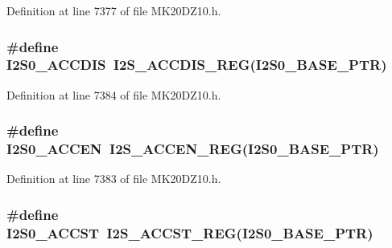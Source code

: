Definition at line 7377 of file M\+K20\+D\+Z10.\+h.

\subsubsection[{\texorpdfstring{I2\+S0\+\_\+\+A\+C\+C\+D\+IS}{I2S0_ACCDIS}}]{\setlength{\rightskip}{0pt plus 5cm}\#define I2\+S0\+\_\+\+A\+C\+C\+D\+IS~{\bf I2\+S\+\_\+\+A\+C\+C\+D\+I\+S\+\_\+\+R\+EG}({\bf I2\+S0\+\_\+\+B\+A\+S\+E\+\_\+\+P\+TR})}\hypertarget{group___i2_s___register___accessor___macros_ga5f11c0b20979a1e2af8ee912693250c7}{}\label{group___i2_s___register___accessor___macros_ga5f11c0b20979a1e2af8ee912693250c7}


Definition at line 7384 of file M\+K20\+D\+Z10.\+h.

\subsubsection[{\texorpdfstring{I2\+S0\+\_\+\+A\+C\+C\+EN}{I2S0_ACCEN}}]{\setlength{\rightskip}{0pt plus 5cm}\#define I2\+S0\+\_\+\+A\+C\+C\+EN~{\bf I2\+S\+\_\+\+A\+C\+C\+E\+N\+\_\+\+R\+EG}({\bf I2\+S0\+\_\+\+B\+A\+S\+E\+\_\+\+P\+TR})}\hypertarget{group___i2_s___register___accessor___macros_ga367caa4972990d3a4c0aebe797a406b5}{}\label{group___i2_s___register___accessor___macros_ga367caa4972990d3a4c0aebe797a406b5}


Definition at line 7383 of file M\+K20\+D\+Z10.\+h.

\subsubsection[{\texorpdfstring{I2\+S0\+\_\+\+A\+C\+C\+ST}{I2S0_ACCST}}]{\setlength{\rightskip}{0pt plus 5cm}\#define I2\+S0\+\_\+\+A\+C\+C\+ST~{\bf I2\+S\+\_\+\+A\+C\+C\+S\+T\+\_\+\+R\+EG}({\bf I2\+S0\+\_\+\+B\+A\+S\+E\+\_\+\+P\+TR})}\hypertarget{group___i2_s___register___accessor___macros_gad248bf834a2fce57b9eb1e90aa261801}{}\label{group___i2_s___register___accessor___macros_gad248bf834a2fce57b9eb1e90aa261801}


